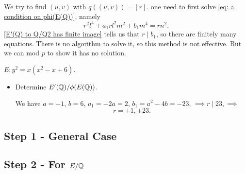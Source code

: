 We try to find $(u, v)$ with $q((u, v)) = [r]$.
one need to first solve
\cref{eq: a condition on phi(E(Q))}, namely
\[r^2l^4 + a_1rl^2m^2 + b_1m^4 = rn^2.\]
\cref{E'(Q) to Q/Q2 has finite image} tells us that $r\mid b_1$,
so there are finitely many equations.
There is no algorithm to solve it, so this method is not effective.
But we can mod $p$ to show it has no solution.
\begin{example}
    $E : y^2 = x(x^2 - x + 6)$.
\begin{itemize}
\item Determine $E'(\mathbb{Q})/\phi(E(\mathbb{Q}))$.\par
We have $a = -1$, $b = 6$, $a_1 = -2a = 2$, $b_1 = a^2 - 4b = -23$,
$\implies r\mid 23, \implies$ \[r = \pm1,\pm 23.\]


\end{itemize}
    
\end{example}







\subsection{Step 1 - General Case}

\subsection{Step 2 - For \texorpdfstring{$E/\mathbb{Q}$}{E/Q}}
